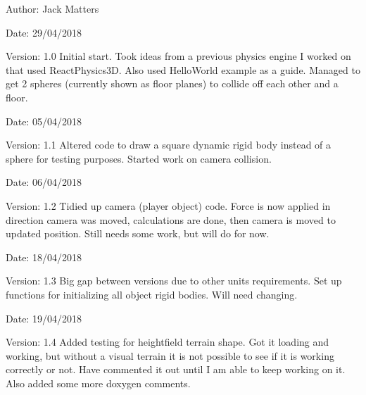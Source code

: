 \begin{Desc}
\item[Author:]Jack Matters\end{Desc}
\begin{Desc}
\item[Date:]29/04/2018 \end{Desc}
\begin{Desc}
\item[Version:]1.0 Initial start. Took ideas from a previous physics engine I worked on that used ReactPhysics3D. Also used HelloWorld example as a guide. Managed to get 2 spheres (currently shown as floor planes) to collide off each other and a floor.\end{Desc}
\begin{Desc}
\item[Date:]05/04/2018 \end{Desc}
\begin{Desc}
\item[Version:]1.1 Altered code to draw a square dynamic rigid body instead of a sphere for testing purposes. Started work on camera collision.\end{Desc}
\begin{Desc}
\item[Date:]06/04/2018 \end{Desc}
\begin{Desc}
\item[Version:]1.2 Tidied up camera (player object) code. Force is now applied in direction camera was moved, calculations are done, then camera is moved to updated position. Still needs some work, but will do for now.\end{Desc}
\begin{Desc}
\item[Date:]18/04/2018 \end{Desc}
\begin{Desc}
\item[Version:]1.3 Big gap between versions due to other units requirements. Set up functions for initializing all object rigid bodies. Will need changing.\end{Desc}
\begin{Desc}
\item[Date:]19/04/2018 \end{Desc}
\begin{Desc}
\item[Version:]1.4 Added testing for heightfield terrain shape. Got it loading and working, but without a visual terrain it is not possible to see if it is working correctly or not. Have commented it out until I am able to keep working on it. Also added some more doxygen comments.\end{Desc}
